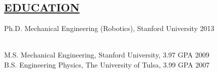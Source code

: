 \documentclass[line,margin]{res}
\newcommand{\CVOnly}[1]{}
\newcommand{\CVOnly}[1]{#1}
\begin{document}
\address{469 Homer Ave, Palo Alto, CA 94301}
\address{650.762.6844}
\address{adamleeper@gmail.com} 
\address{www.adamleeper.com}

 
\begin{resume}
 
\section{\underline{EDUCATION}}
\vspace{1.0pc}
Ph.D. Mechanical Engineering (Robotics), Stanford University 
\hfill 2013%
\CVOnly{ {\small
\\[0.0pc]{\bf Advisor:} Professor Kenneth Salisbury
\\[0.0pc]{\bf Thesis:} Robot Telemanipulation in Unstructured Environments: Sensors, Algorithms, Interfaces.
\\[-0.6pc]} }
%
\\[0.0pc]M.S. Mechanical Engineering, Stanford University, 3.97 GPA \hfill  2009 
\\[0.0pc] B.S. Engineering Physics, The University of Tulsa, 3.99 GPA \hfill 2007 
%
%

\end{resume}
\end{document}
